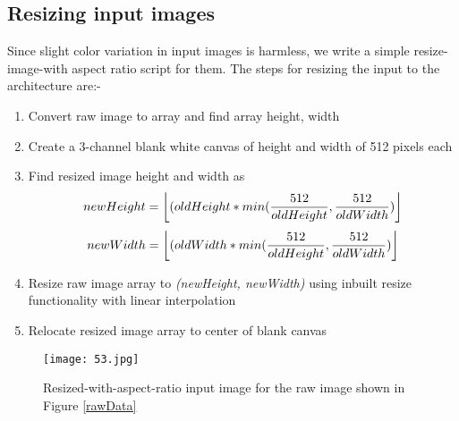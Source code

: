 \documentclass[a4paper]{article}
\DeclarePairedDelimiter\floor{\lfloor}{\rfloor}
\begin{document}
\subsection{Resizing input images}
Since slight color variation in input images is harmless, we write a simple resize-image-with aspect ratio script for them. The steps for resizing the input to the architecture are:-
\begin{enumerate}
    \item Convert raw image to array and find array height, width
    \item Create a 3-channel blank white canvas of height and width of 512 pixels each
    \item Find resized image height and width as 
    \[
    newHeight = \floor*{(oldHeight * min(\frac{512}{oldHeight}, \frac{512}{oldWidth})}
    \]
    \[
    newWidth = \floor*{(oldWidth * min(\frac{512}{oldHeight}, \frac{512}{oldWidth})}
    \]
    \item Resize raw image array to \textit{(newHeight, newWidth)} using inbuilt resize functionality with linear interpolation
    \item Relocate resized image array to center of blank canvas
\end{enumerate}
\begin{figure}[H]
    \centering
    \texttt{[image: 53.jpg]}
    \caption{Resized-with-aspect-ratio input image for the raw image shown in Figure \ref{rawData}}
    \label{resizedrawData}
\end{figure}
\end{document}
